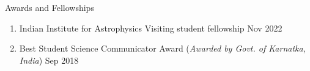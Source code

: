 \begin{rSection}{Awards and Fellowships} 
\begin{enumerate}[itemsep=-0.5em, leftmargin=-0.8em, rightmargin=0.3em]
    \item [] Indian Institute for Astrophysics Visiting student fellowship \hfill Nov 2022
    \item [] Best Student Science Communicator Award (\textit{Awarded by Govt. of Karnatka, India}) \hfill Sep 2018
\end{enumerate}
\end{rSection}